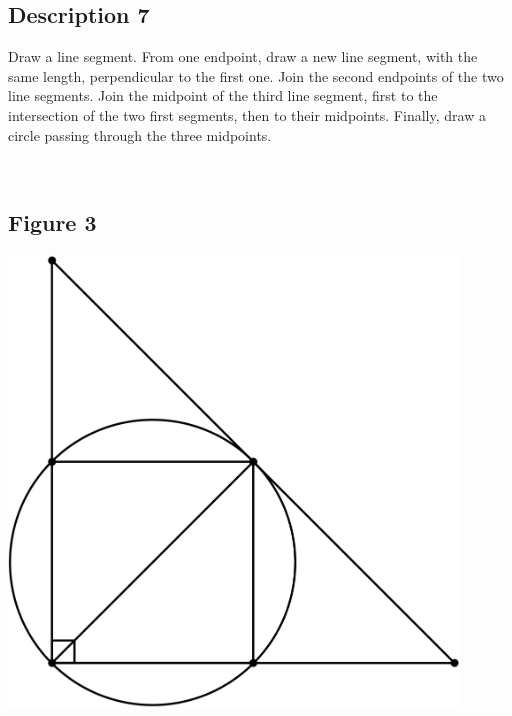 \documentclass[12pt,a4paper,article,english,firamath]{nsi}
\begin{document}
\maketitle

\subsection*{Description 7}
{\brettley 

Draw a line segment. From one endpoint, draw a new line segment, with the same length, perpendicular to the first one.
Join the second endpoints of the two line segments. Join the midpoint of the third line segment, first to the
intersection of the two first segments, then to their midpoints.  Finally, draw a circle passing through the three
midpoints.}\\[1em]



\subsection*{Figure 3}
\begin{center}
    \includegraphics[height=12cm]{img/fig08.png}
\end{center}
\end{document}
